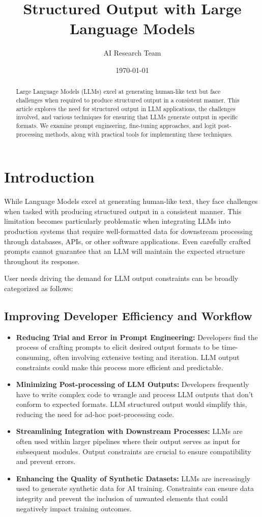 \documentclass{article}
\title{Structured Output with Large Language Models}
\author{AI Research Team}
\date{\today}
\begin{document}
\maketitle

\begin{abstract}
Large Language Models (LLMs) excel at generating human-like text but face challenges when required to produce structured output in a consistent manner. This article explores the need for structured output in LLM applications, the challenges involved, and various techniques for ensuring that LLMs generate output in specific formats. We examine prompt engineering, fine-tuning approaches, and logit post-processing methods, along with practical tools for implementing these techniques.
\end{abstract}

\section{Introduction}

While Language Models excel at generating human-like text, they face challenges when tasked with producing structured output in a consistent manner. This limitation becomes particularly problematic when integrating LLMs into production systems that require well-formatted data for downstream processing through databases, APIs, or other software applications. Even carefully crafted prompts cannot guarantee that an LLM will maintain the expected structure throughout its response.

User needs driving the demand for LLM output constraints can be broadly categorized as follows:

\subsection{Improving Developer Efficiency and Workflow}
\begin{itemize}
    \item \textbf{Reducing Trial and Error in Prompt Engineering:} Developers find the process of crafting prompts to elicit desired output formats to be time-consuming, often involving extensive testing and iteration. LLM output constraints could make this process more efficient and predictable.
    \item \textbf{Minimizing Post-processing of LLM Outputs:} Developers frequently have to write complex code to wrangle and process LLM outputs that don't conform to expected formats. LLM structured output would simplify this, reducing the need for ad-hoc post-processing code.
    \item \textbf{Streamlining Integration with Downstream Processes:} LLMs are often used within larger pipelines where their output serves as input for subsequent modules. Output constraints are crucial to ensure compatibility and prevent errors.
    \item \textbf{Enhancing the Quality of Synthetic Datasets:} LLMs are increasingly used to generate synthetic data for AI training. Constraints can ensure data integrity and prevent the inclusion of unwanted elements that could negatively impact training outcomes.
\end{itemize}
\end{document}
